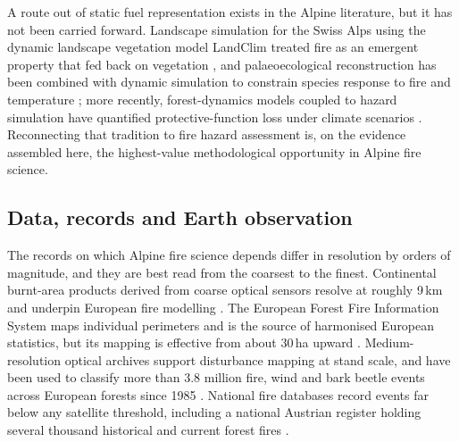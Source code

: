\documentclass[11pt,a4paper]{article}
\begin{document}
A route out of static fuel representation exists in the Alpine literature, but it has not been carried forward. Landscape simulation for the Swiss Alps using the dynamic landscape vegetation model LandClim treated fire as an emergent property that fed back on vegetation \citep{schumacher_relative_2006, colombaroli_species_2010}, and palaeoecological reconstruction has been combined with dynamic simulation to constrain species response to fire and temperature \citep{colombaroli_species_2010}; more recently, forest-dynamics models coupled to hazard simulation have quantified protective-function loss under climate scenarios \citep{hillebrand_contrasting_2023, moos_climate_2021}. Reconnecting that tradition to fire hazard assessment is, on the evidence assembled here, the highest-value methodological opportunity in Alpine fire science.

\subsection{Data, records and Earth observation}
\label{sec:data}

The records on which Alpine fire science depends differ in resolution by orders of magnitude, and they are best read from the coarsest to the finest. Continental burnt-area products derived from coarse optical sensors resolve at roughly 9\,km and underpin European fire modelling \citep{forrest_understanding_2024}. The European Forest Fire Information System maps individual perimeters and is the source of harmonised European statistics, but its mapping is effective from about 30\,ha upward \citep{muller_forest_2020, beloiu_climatedriven_2026}. Medium-resolution optical archives support disturbance mapping at stand scale, and have been used to classify more than 3.8 million fire, wind and bark beetle events across European forests since 1985 \citep{miguel_unravelling_2026}. National fire databases record events far below any satellite threshold, including a national Austrian register holding several thousand historical and current forest fires \citep{papathomakohle_towards_2025}.
\end{document}
